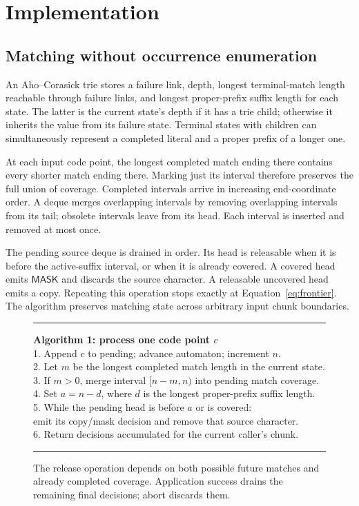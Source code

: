 \documentclass[11pt,a4paper]{article}
\newcommand{\mask}{\mathsf{MASK}}
\begin{document}
\section{Implementation}
\subsection{Matching without occurrence enumeration}
An Aho--Corasick trie stores a failure link, depth, longest terminal-match length reachable through failure links, and longest proper-prefix suffix length for each state. The latter is the current state's depth if it has a trie child; otherwise it inherits the value from its failure state. Terminal states with children can simultaneously represent a completed literal and a proper prefix of a longer one.

At each input code point, the longest completed match ending there contains every shorter match ending there. Marking just its interval therefore preserves the full union of coverage. Completed intervals arrive in increasing end-coordinate order. A deque merges overlapping intervals by removing overlapping intervals from its tail; obsolete intervals leave from its head. Each interval is inserted and removed at most once.

The pending source deque is drained in order. Its head is releasable when it is before the active-suffix interval, or when it is already covered. A covered head emits $\mask$ and discards the source character. A releasable uncovered head emits a copy. Repeating this operation stops exactly at Equation~\eqref{eq:frontier}. The algorithm preserves matching state across arbitrary input chunk boundaries.

\begin{figure}[t]
\centering\small
\begin{minipage}{.94\linewidth}
\hrule\vspace{5pt}
\textbf{Algorithm 1: process one code point $c$}\\
1. Append $c$ to pending; advance automaton; increment $n$.\\
2. Let $m$ be the longest completed match length in the current state.\\
3. If $m>0$, merge interval $[n-m,n)$ into pending match coverage.\\
4. Set $a=n-d$, where $d$ is the longest proper-prefix suffix length.\\
5. While the pending head is before $a$ or is covered:\\
\hspace*{12pt}emit its copy/mask decision and remove that source character.\\
6. Return decisions accumulated for the current caller's chunk.\vspace{5pt}\hrule
\end{minipage}
\caption{The release operation depends on both possible future matches and already completed coverage. Application success drains the remaining final decisions; abort discards them.}
\label{fig:algorithm}
\end{figure}
\end{document}
